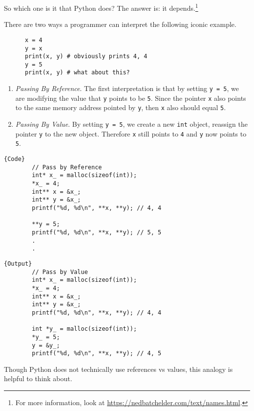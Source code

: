   So which one is it that Python does? The answer is: it depends.\footnote{For more information, look at \href{https://nedbatchelder.com/text/names.html}{https://nedbatchelder.com/text/names.html}.} 

  \begin{example}
    There are two ways a programmer can interpret the following iconic example.
    \begin{lstlisting}
      x = 4 
      y = x 
      print(x, y) # obviously prints 4, 4
      y = 5
      print(x, y) # what about this? 
    \end{lstlisting}

    \begin{enumerate}
      \item \textit{Passing By Reference}. The first interpretation is that by setting \texttt{y = 5}, we are modifying the value that \texttt{y} points to be \texttt{5}. Since the pointer \texttt{x} also points to the same memory address pointed by \texttt{y}, then \texttt{x} also should equal \texttt{5}. 
      \item \textit{Passing By Value}. By setting \texttt{y = 5}, we create a new \texttt{int} object, reassign the pointer \texttt{y} to the new object. Therefore \texttt{x} still points to \texttt{4} and \texttt{y} now points to \texttt{5}. 
    \end{enumerate}
    \noindent\begin{minipage}{.5\textwidth}
      \begin{lstlisting}[]{Code}
        // Pass by Reference
        int* x_ = malloc(sizeof(int)); 
        *x_ = 4; 
        int** x = &x_; 
        int** y = &x_; 
        printf("%d, %d\n", **x, **y); // 4, 4

        **y = 5; 
        printf("%d, %d\n", **x, **y); // 5, 5
        .
        .
      \end{lstlisting}
      \end{minipage}
      \hfill
      \begin{minipage}{.49\textwidth}
      \begin{lstlisting}[]{Output}
        // Pass by Value
        int* x_ = malloc(sizeof(int)); 
        *x_ = 4; 
        int** x = &x_; 
        int** y = &x_; 
        printf("%d, %d\n", **x, **y); // 4, 4

        int *y_ = malloc(sizeof(int)); 
        *y_ = 5; 
        y = &y_; 
        printf("%d, %d\n", **x, **y); // 4, 5
      \end{lstlisting}
    \end{minipage}

    Though Python does not technically use references vs values, this analogy is helpful to think about.  
  \end{example}

